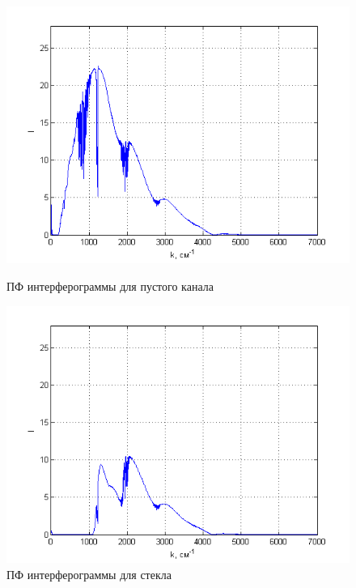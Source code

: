 \documentclass[a4paper,12pt]{article} %
\begin{document}
    \begin{figure}[h!]
        \begin{center}
            \begin{minipage}[h!]{0.48\linewidth}
                \includegraphics[width=1\linewidth]{5.png}
                \caption{ПФ интерферограммы для пустого канала}
                \label{picture_5}
            \end{minipage}
            \hfill
            \begin{minipage}[h!]{0.48\linewidth}
                \includegraphics[width=1\linewidth]{6.png}
                \caption{ПФ интерферограммы для стекла}
                \label{picture_6}
            \end{minipage}

\end{center}
\end{figure}
\end{document}
